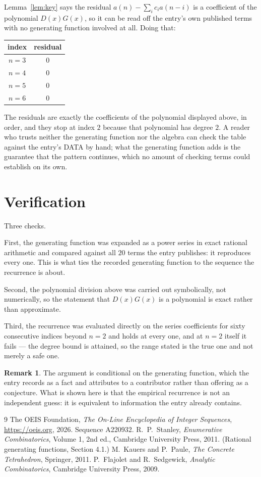\documentclass[11pt,a4paper]{article}
\theoremstyle{plain}
\theoremstyle{definition}
\newtheorem{remark}[theorem]{Remark}
\begin{document}
Lemma~\ref{lem:key} says the residual $a(n)-\sum_ic_ia(n-i)$ is a coefficient of the
polynomial $D(x)G(x)$, so it can be read off the entry's own published terms with no
generating function involved at all. Doing that:
\begin{center}
\begin{tabular}{cc}
index & residual \\ \hline
$n=3$ & $0$ \\
$n=4$ & $0$ \\
$n=5$ & $0$ \\
$n=6$ & $0$
\end{tabular}
\end{center}
The residuals are exactly the coefficients of the polynomial displayed above, in order, and
they stop at index $2$ because that polynomial has degree $2$. A reader who trusts
neither the generating function nor the algebra can check the table against the entry's DATA
by hand; what the generating function adds is the guarantee that the pattern continues, which
no amount of checking terms could establish on its own.

\section{Verification}

Three checks.

First, the generating function was expanded as a power series in exact rational arithmetic and
compared against all $20$ terms the entry publishes: it reproduces every one. This is
what ties the recorded generating function to the sequence the recurrence is about.

Second, the polynomial division above was carried out symbolically, not numerically, so the
statement that $D(x)G(x)$ is a polynomial is exact rather than approximate.

Third, the recurrence was evaluated directly on the series coefficients for sixty consecutive
indices beyond $n=2$ and holds at every one, and at $n=2$ itself it fails --- the
degree bound is attained, so the range stated is the true one and not merely a safe one.

\begin{remark}
The argument is conditional on the generating function, which the entry records as a fact and
attributes to a contributor rather than offering as a conjecture. What is shown here is that
the empirical recurrence is not an independent guess: it is equivalent to information the
entry already contains.
\end{remark}

\begin{thebibliography}{9}
 The OEIS Foundation, \emph{The On-Line Encyclopedia of Integer
Sequences}, \url{https://oeis.org}, 2026. Sequence A220932.
 R.~P.~Stanley, \emph{Enumerative Combinatorics}, Volume 1, 2nd ed.,
Cambridge University Press, 2011. (Rational generating functions, Section 4.1.)
 M.~Kauers and P.~Paule, \emph{The Concrete Tetrahedron}, Springer, 2011.
 P.~Flajolet and R.~Sedgewick, \emph{Analytic Combinatorics}, Cambridge
University Press, 2009.
\end{thebibliography}
\end{document}
